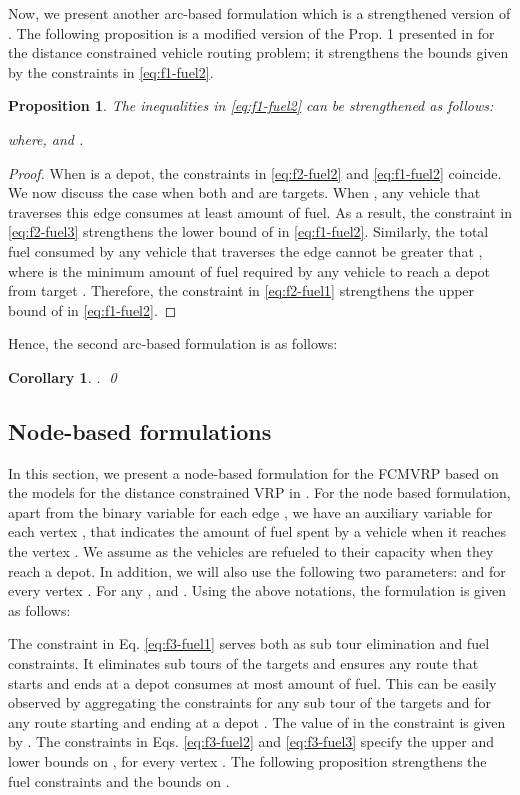 \documentclass[letterpaper, 10pt, conference]{ieeeconf}
\newtheorem{proposition}{Proposition}
\newtheorem{corollary}{Corollary}
\begin{document}
Now, we present another arc-based formulation  which is a strengthened version of . The following proposition is a modified version of the Prop. 1 presented in \cite{Kara2011} for the distance constrained vehicle routing problem; it strengthens the bounds given by the constraints in \eqref{eq:f1-fuel2}. 
\begin{proposition} \label{prop:strengthen} The inequalities in \eqref{eq:f1-fuel2} can be strengthened as follows:

where,  and .
\end{proposition} 
\begin{proof}
When  is a depot, the constraints in \eqref{eq:f2-fuel2} and \eqref{eq:f1-fuel2} coincide. We now discuss the case when both  and  are targets. When , any vehicle that traverses this edge  consumes at least  amount of fuel. As a result, the constraint in \eqref{eq:f2-fuel3} strengthens the lower bound of  in \eqref{eq:f1-fuel2}. Similarly, the total fuel consumed by any vehicle that traverses the edge  cannot be greater that , where  is the minimum amount of fuel required by any vehicle to reach a depot from target . Therefore, the constraint in \eqref{eq:f2-fuel1} strengthens the upper bound of  in \eqref{eq:f1-fuel2}.
\end{proof}
Hence, the second arc-based formulation is as follows:

\begin{corollary} \label{cor:LP} . \hfill \qed
\end{corollary}

\subsection{Node-based formulations \label{subsec:nodebased}} 
In this section, we present a node-based formulation for the FCMVRP based on the models for the distance constrained VRP in \cite{Desrochers1991, Kara2010}. For the node based formulation, apart from the binary variable  for each edge , we have an auxiliary variable  for each vertex , that indicates the amount of fuel spent by a vehicle when it reaches the vertex . We assume  as the vehicles are refueled to their capacity when they reach a depot. In addition, we will also use the following two parameters:  and  for every vertex . For any ,  and . Using the above notations, the formulation  is given as follows:

The constraint in Eq. \eqref{eq:f3-fuel1} serves both as sub tour elimination and fuel constraints. It eliminates sub tours of the targets and ensures any route that starts and ends at a depot consumes at most  amount of fuel. This can be easily observed by aggregating the constraints for any sub tour of the targets and for any route starting and ending at a depot \cite{Desrochers1991}. The value of  in the constraint is given by . The constraints in Eqs. \eqref{eq:f3-fuel2} and \eqref{eq:f3-fuel3} specify the upper and lower bounds on , for every vertex . The following proposition strengthens the fuel constraints and the bounds on . 
\end{document}

